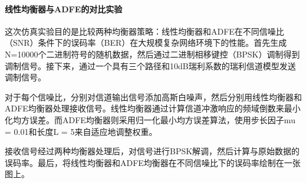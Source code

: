 \documentclass[UTF8,a4paper,12pt]{ctexart}
\numberwithin{equation}{section}
\begin{document}
\paragraph{线性均衡器与ADFE的对比实验}
这次仿真实验目的是比较两种均衡器策略：线性均衡器和ADFE在不同信噪比（SNR）条件下的误码率（BER）在大规模复杂网络环境下的性能。首先生成N=10000个二进制符号的随机数据，然后通过二进制相移键控（BPSK）调制得到调制信号。接下来，通过一个具有三个路径和10dB瑞利系数的瑞利信道模型发送调制信号。

对于每个信噪比，分别对信道输出信号添加高斯白噪声，然后分别用线性均衡器和ADFE均衡器处理接收信号。线性均衡器通过计算信道冲激响应的频域倒数来最小化均方误差。而ADFE均衡器则采用归一化最小均方误差算法，使用步长因子mu = 0.01和长度L = 5来自适应地调整权重。

接收信号经过两种均衡器处理后，对信号进行BPSK解调，然后计算与原始数据的误码率。最后，将线性均衡器和ADFE均衡器在不同信噪比下的误码率绘制在一张图上。
\end{document}
